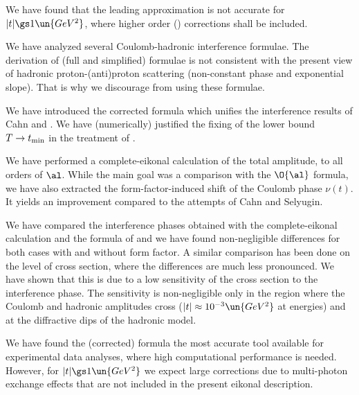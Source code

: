 We have found that the leading  approximation is not accurate for $|t| \gs 1\un{GeV^2}$, where higher order () corrections shall be included.

We have analyzed several Coulomb-hadronic interference formulae. The derivation of (full and simplified) \WaY{} formulae is not consistent with the present view of hadronic proton-(anti)proton scattering (non-constant phase and exponential slope). That is why we discourage from using these formulae.

We have introduced the corrected \KaL{} formula which unifies the interference results of Cahn and \KaL. We have (numerically) justified the fixing of the lower bound $T\to t_{\rm min}$ in the treatment of \KaL{}.

We have performed a complete-eikonal calculation of the total amplitude, to all orders of $\al$. While the main goal was a comparison with the $\O{\al}$ \KaL{} formula, we have also extracted the form-factor-induced shift of the Coulomb phase $\nu(t)$. It yields an improvement compared to the attempts of Cahn and Selyugin.

We have compared the interference phases obtained with the complete-eikonal calculation and the formula of \KaL{} and we have found non-negligible differences for both cases with and without form factor. A similar comparison has been done on the level of cross section, where the differences are much less pronounced. We have shown that this is due to a low sensitivity of the cross section to the interference phase. The sensitivity is non-negligible only in the region where the Coulomb and hadronic amplitudes cross ($|t|\approx 10^{-3}\un{GeV^2}$ at  energies) and at the diffractive dips of the hadronic model.

We have found the (corrected) \KaL{} formula the most accurate tool available for experimental data analyses, where high computational performance is needed. However, for $|t| \gs 1\un{GeV^2}$ we expect large corrections due to multi-photon exchange effects that are not included in the present eikonal description.
